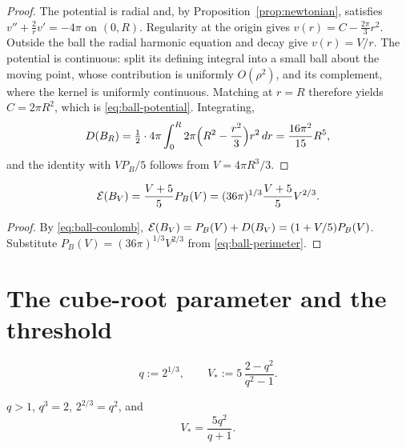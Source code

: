 \begin{proof}
The potential is radial and, by Proposition~\ref{prop:newtonian}, satisfies
$v''+\tfrac2rv'=-4\pi$ on $(0,R)$.  Regularity at the origin gives
$v(r)=C-\tfrac{2\pi}3r^2$.  Outside the ball the radial harmonic equation and
decay give $v(r)=V/r$.  The potential is continuous: split its defining
integral into a small ball about the moving point, whose contribution is
uniformly $O(\rho^2)$, and its complement, where the kernel is uniformly
continuous.  Matching at $r=R$ therefore yields $C=2\pi R^2$, which is
\eqref{eq:ball-potential}.  Integrating,
\[
  D(B_R)=\tfrac12\cdot4\pi\int_0^R2\pi\Bigl(R^2-\frac{r^2}3\Bigr)r^2\,dr
  =\frac{16\pi^2}{15}R^5 ,
\]
and the identity with $VP_B/5$ follows from $V=4\pi R^3/3$.
\end{proof}

\begin{corollary}\label{cor:ball-energy}
\begin{equation}\label{eq:ball-energy}
  \mathcal E(B_V)=\frac{V+5}{5}P_B(V)
  =(36\pi)^{1/3}\frac{V+5}{5}V^{2/3}.
\end{equation}
\end{corollary}

\begin{proof}
By \eqref{eq:ball-coulomb},
$\mathcal E(B_V)=P_B(V)+D(B_V)=(1+V/5)P_B(V)$.  Substitute
$P_B(V)=(36\pi)^{1/3}V^{2/3}$ from \eqref{eq:ball-perimeter}.
\end{proof}

\section{The cube-root parameter and the threshold}

\begin{definition}[$q$ and $V_*$]\label{def:threshold}
\[
  q:=2^{1/3},
  \qquad
  V_*:=5\,\frac{2-q^2}{q^2-1}.
\]
\end{definition}

\begin{lemma}\label{lem:Vstar-form}
$q>1$, $q^3=2$, $2^{2/3}=q^2$, and
\begin{equation}\label{eq:Vstar-form}
  V_*=\frac{5q^2}{q+1}.
\end{equation}
\end{lemma}

